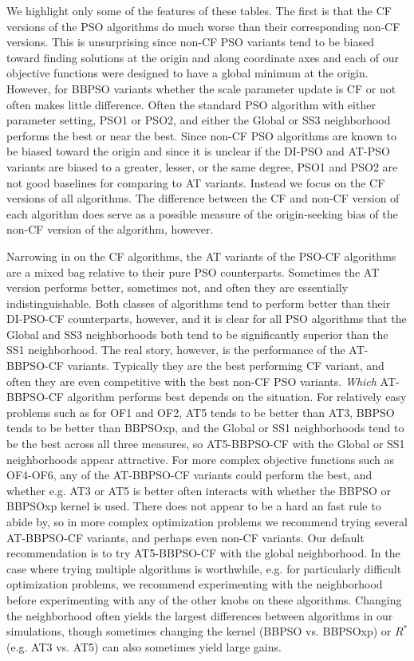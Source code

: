\documentclass[cmbright]{staauth}
\begin{document}
We highlight only some of the features of these tables. The first is that the CF versions of the PSO algorithms do much worse than their corresponding non-CF versions. This is unsurprising since non-CF PSO variants tend to be biased toward finding solutions at the origin and along coordinate axes and each of our objective functions were designed to have a global minimum at the origin. However, for BBPSO variants whether the scale parameter update is CF or not often makes little difference. Often the standard PSO algorithm with either parameter setting, PSO1 or PSO2, and either the Global or SS3 neighborhood performs the best or near the best. Since non-CF PSO algorithms are known to be biased toward the origin and since it is unclear if the DI-PSO and AT-PSO variants are biased to a greater, lesser, or the same degree, PSO1 and PSO2 are not good baselines for comparing to AT variants. Instead we focus on the CF versions of all algorithms. The difference between the CF and non-CF version of each algorithm does serve as a possible measure of the origin-seeking bias of the non-CF version of the algorithm, however.

Narrowing in on the CF algorithms, the AT variants of the PSO-CF algorithms are a mixed bag relative to their pure PSO counterparts. Sometimes the AT version performs better, sometimes not, and often they are essentially indistinguishable. Both classes of algorithms tend to perform better than their DI-PSO-CF counterparts, however, and it is clear for all PSO algorithms that the Global and SS3 neighborhoods both tend to be significantly superior than the SS1 neighborhood. The real story, however, is the performance of the AT-BBPSO-CF variants. Typically they are the best performing CF variant, and often they are even competitive with the best non-CF PSO variants. \emph{Which} AT-BBPSO-CF algorithm performs best depends on the situation. For relatively easy problems such as for OF1 and OF2, AT5 tends to be better than AT3, BBPSO tends to be better than BBPSOxp, and the Global or SS1 neighborhoods tend to be the best across all three measures, so AT5-BBPSO-CF with the Global or SS1 neighborhoods appear attractive. For more complex objective functions such as OF4-OF6, any of the AT-BBPSO-CF variants could perform the best, and whether e.g. AT3 or AT5 is better often interacts with whether the BBPSO or BBPSOxp kernel is used. There does not appear to be a hard an fast rule to abide by, so in more complex optimization problems we recommend trying several AT-BBPSO-CF variants, and perhaps even non-CF variants. Our default recommendation is to try AT5-BBPSO-CF with the global neighborhood. In the case where trying multiple algorithms is worthwhile, e.g. for particularly difficult optimization problems, we recommend experimenting with the neighborhood before experimenting with any of the other knobs on these algorithms. Changing the neighborhood often yields the largest differences between algorithms in our simulations, though sometimes changing the kernel (BBPSO vs. BBPSOxp) or $R^*$ (e.g. AT3 vs. AT5) can also sometimes yield large gains.
\end{document}
